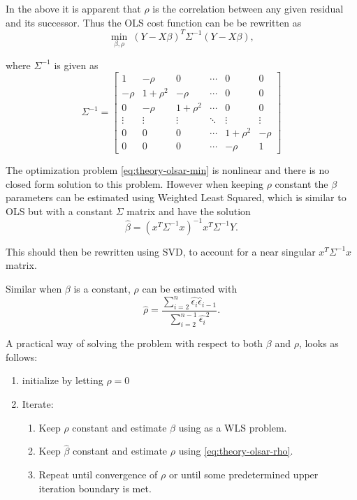 In the above it is apparent that $\rho$ is the correlation between any given residual and its successor. Thus the OLS cost function can be be rewritten as
\begin{equation}
\min_{\beta, \rho}\ (Y-X\beta)^T \Sigma^{-1}(Y-X\beta),
\label{eq:theory-olsar-min}
\end{equation}

where $ \Sigma^{-1}$ is given as
\begin{equation}
\Sigma^{-1}  = \begin{bmatrix}
1         & -\rho         & 0               & \cdots & 0              & 0         \\
-\rho   & 1+\rho^2 & -\rho         & \cdots & 0               & 0         \\
0         & -\rho         & 1+\rho^2 & \cdots &0                & 0         \\
\vdots & \vdots      & \vdots       & \ddots & \vdots      & \vdots \\
0         & 0               &0                & \cdots & 1+\rho^2 & -\rho    \\
0         & 0               &0                & \cdots &-\rho          & 1
\end{bmatrix}
\end{equation}

The optimization problem \eqref{eq:theory-olsar-min} is nonlinear and there is no closed form solution to this problem. However when keeping $\rho$ constant the $\beta$ parameters can be estimated using Weighted Least Squared, which is similar to OLS but with a constant $\Sigma$ matrix and have the solution \cite[p.~38]{time-series-analysis}
\begin{equation}
\hat{\beta} = (x^T \Sigma^{-1} x)^{-1} x^T \Sigma^{-1} Y.
\end{equation}

This should then be rewritten using SVD, to account for a near singular $x^T \Sigma^{-1} x$ matrix.

Similar when $\beta$ is a constant, $\rho$ can be estimated with  \cite[p.~178]{autocorrelation-kousgaard}
\begin{equation}
\hat{\rho} = \frac{ \sum_{i=2}^n \hat{\epsilon_i}\hat{\epsilon}_{i-1} }{ \sum_{i=2}^{n-1} \hat{\epsilon_i}^2 }.
\label{eq:theory-olsar-rho}
\end{equation}

A practical way of solving the problem with respect to both $\beta$ and $\rho$, looks as follows:
\begin{enumerate}
\item initialize by letting $\rho=0$
\item Iterate: \begin{enumerate}
	\item Keep $\hat{\rho}$ constant and estimate $\beta$ using as a WLS problem.
	
	\item Keep $\hat{\beta}$ constant and estimate $\rho$ using \eqref{eq:theory-olsar-rho}.
	
	\item Repeat until convergence of $\rho$ or until some predetermined upper iteration boundary is met.
\end{enumerate}
\end{enumerate}
